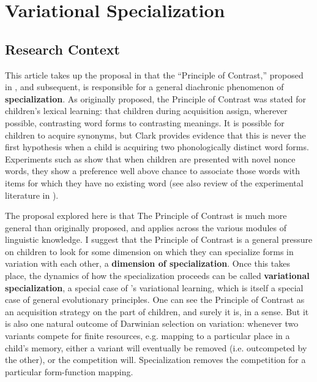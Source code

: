 \documentclass{artikel3}
\begin{document}
\section{Variational Specialization}

\subsection{Research Context}


This article takes up the proposal in \citet{fruehwaldwallenberginprep} that the ``Principle of Contrast,'' proposed in \citet{clark1987, clark1990}, and subsequent, is responsible for a general diachronic phenomenon of \textbf{specialization}. As originally proposed, the Principle of Contrast was stated for children's lexical learning: that children during acquisition assign, wherever possible, contrasting word forms to contrasting meanings. It is possible for children to acquire synonyms, but Clark provides evidence that this is never the first hypothesis when a child is acquiring two phonologically distinct word forms. Experiments such as \citet{markmanwachtel1988} show that when children are presented with novel nonce words, they show a preference well above chance to associate those words with items for which they have no existing word (see also review of the experimental literature in \citealt{bionetal2013}). 

The proposal explored here is that The Principle of Contrast is much more general than originally proposed, and applies across the various modules of linguistic knowledge. I suggest that the Principle of Contrast is a general pressure on children to look for some dimension on which they can specialize forms in variation with each other, a \textbf{dimension of specialization}. Once this takes place, the dynamics of how the specialization proceeds can be called \textbf{variational specialization}, a special case of \citet{yang2000, yang2002}'s variational learning, which is itself a special case of general evolutionary principles. One can see the Principle of Contrast as an acquisition strategy on the part of children, and surely it is, in a sense. But it is also one natural outcome of Darwinian selection on variation: whenever two variants compete for finite resources, e.g. mapping to a particular place in a child's memory, either a variant will eventually be removed (i.e. outcompeted by the other), or the competition will. Specialization removes the competition for a particular form-function mapping.
\end{document}
